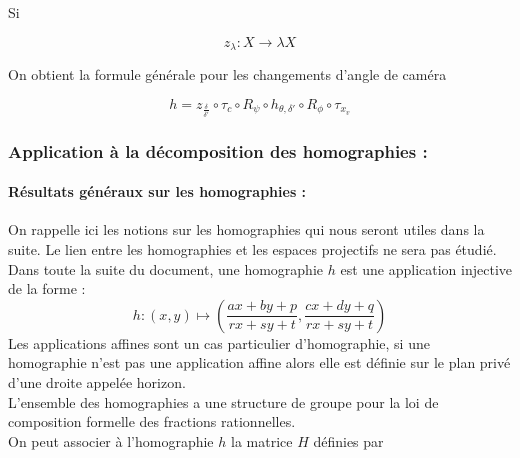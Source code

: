 Si

\begin{equation*}
z_{\lambda}:X\rightarrow \lambda X
\end{equation*}

On obtient la formule générale pour les changements d'angle de caméra

\begin{equation}
h=z_{\frac{\delta}{\delta'}} \circ \tau_{c} \circ R_{\psi} \circ h_{\theta,\delta'} \circ R_{\phi} \circ \tau_{x_{v}}
\label{formul_decomp}
\end{equation}




\subsubsection{Application à la décomposition des homographies :}
\paragraph{Résultats généraux sur les homographies :}
 On rappelle ici les notions sur les homographies qui nous seront utiles dans la suite. Le lien entre les homographies et les espaces projectifs ne sera pas étudié. Dans toute la suite du document, une homographie $h$ est une application injective de la forme :
	\[h:(x,y)\mapsto \left(\frac{ax+by+p}{rx+sy+t},\frac{cx+dy+q}{rx+sy+t}\right)\]
Les applications affines sont un cas particulier d'homographie, si une homographie n'est pas une application affine alors elle est définie sur le plan privé d'une droite appelée horizon.\\	
  L'ensemble des homographies a une structure de groupe pour la loi de composition formelle des fractions rationnelles.\\%
  On peut  associer à l'homographie $h$ la matrice $H$ définies par
  
